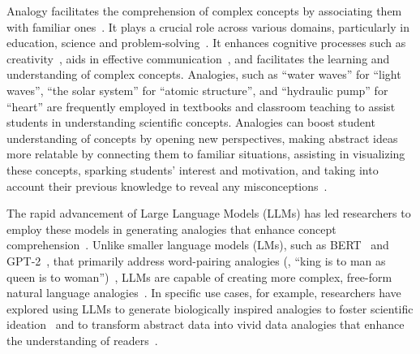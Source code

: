 
Analogy facilitates the comprehension of complex concepts by associating them with familiar ones~\cite{gentner_structure_1997,davies_analogy_1985,gentner_computational_2011,mitchell_abstraction_2021}. 
It plays a crucial role across various domains, particularly in education, science and problem-solving~\cite{vendetti_analogical_2015, thagard_analogy_1992, richland_analogy_2015,treagust_science_1992, gray_teaching_2021, oliva_teaching_2007}. 
It enhances cognitive processes such as creativity~\cite{holyoak_mental_1996,goel_design_1997,kao_how_2020}, aids in effective communication~\cite{casarett_can_2010,galesic_using_2013}, and facilitates the learning and understanding of complex concepts.
Analogies, such as ``water waves'' for ``light waves'', ``the solar system'' for ``atomic structure'', and ``hydraulic pump'' for ``heart'' are frequently employed in textbooks and classroom teaching to assist students in understanding scientific concepts.
Analogies can boost student understanding of concepts by opening new perspectives, making abstract ideas more relatable by connecting them to familiar situations, assisting in visualizing these concepts, sparking students’ interest and motivation, and taking into account their previous knowledge to reveal any misconceptions~\cite{duit1991role}.
 
The rapid advancement of Large Language Models (LLMs) has led researchers to employ these models in generating analogies that enhance concept comprehension~\cite{openai_gpt-4_2023}.
Unlike smaller language models (LMs), such as BERT~\cite{devlin-etal-2019-bert} and GPT-2~\cite{radford2019language}, that primarily address word-pairing analogies (\eg, ``king is to man as queen is to woman'')~\cite{mikolov_linguistic_2013,boteanu_solving_2015,gladkova_analogy-based_2016,chen_e-kar_2022}, LLMs are capable of creating more complex, free-form natural language analogies~\cite{bhavya_analogy_2022}.
In specific use cases, for example, researchers have explored using LLMs to generate biologically inspired analogies to foster scientific ideation~\cite{kang_biospark_2024} and to transform abstract data into vivid data analogies that enhance the understanding of readers~\cite{chen_beyond_2024}.


